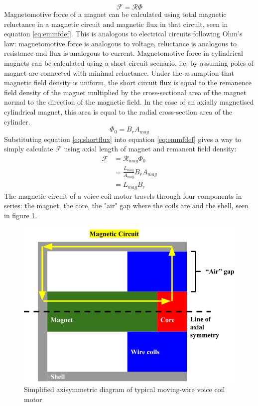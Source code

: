 \documentclass[a4paper,12pt]{article}
\begin{document}
\begin{equation} \label{eq:emmfdef}
\mathcal{F}=\mathcal{R} \Phi
\end{equation}
Magnetomotive force of a magnet can be calculated using total magnetic reluctance in a magnetic circuit and magnetic flux in that circuit, seen in equation \ref{eq:emmfdef}. This is analogous to electrical circuits following Ohm's law: magnetomotive force is analogous to voltage, reluctance is analogous to resistance and flux is analogous to current. Magnetomotive force in cylindrical magnets can be calculated using a short circuit scenario, i.e. by assuming poles of magnet are connected with minimal reluctance. Under the assumption that magnetic field density is uniform, the short circuit flux is equal to the remanence field density of the magnet multiplied by the cross-sectional area of the magnet normal to the direction of the magnetic field. In the case of an axially magnetised cylindrical magnet, this area is equal to the radial cross-section area of the cylinder.
\begin{equation}\label{eq:shortflux}
\Phi_0 = B_rA_{mag}
\end{equation}
Substituting equation \ref{eq:shortflux} into equation \ref{eq:emmfdef} gives a way to simply calculate $\mathcal{F}$ using axial length of magnet and remanent field density:
\begin{equation}\label{eq:emmf1}
\begin{split}
\mathcal{F} & = \mathcal{R}_{mag} \Phi_0\\
& = \frac{L_{mag}}{A_{mag}}B_r A_{mag}\\
& = L_{mag} B_r
\end{split}
\end{equation}
The magnetic circuit of a voice coil motor travels through four components in series: the magnet, the core, the "air" gap where the coils are and the shell, seen in figure \ref{fg:simplemotor}.
\begin{figure}[h] \label{fg:simplemotor}
	\centering
	\includegraphics[scale=0.4]{simplifiedMotor.png}
	\caption{Simplified axisymmetric diagram of typical moving-wire voice coil motor}
\end{figure}
\end{document}

